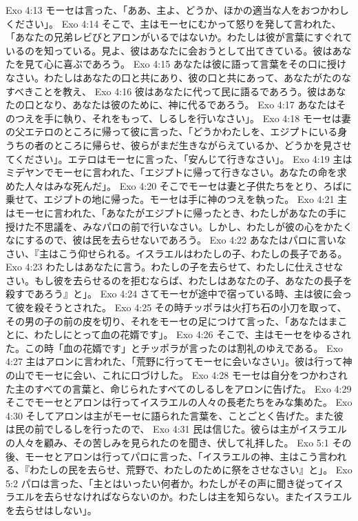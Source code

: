 Exo 4:13  モーセは言った、「ああ、主よ、どうか、ほかの適当な人をおつかわしください」。
Exo 4:14  そこで、主はモーセにむかって怒りを発して言われた、「あなたの兄弟レビびとアロンがいるではないか。わたしは彼が言葉にすぐれているのを知っている。見よ、彼はあなたに会おうとして出てきている。彼はあなたを見て心に喜ぶであろう。
Exo 4:15  あなたは彼に語って言葉をその口に授けなさい。わたしはあなたの口と共にあり、彼の口と共にあって、あなたがたのなすべきことを教え、
Exo 4:16  彼はあなたに代って民に語るであろう。彼はあなたの口となり、あなたは彼のために、神に代るであろう。
Exo 4:17  あなたはそのつえを手に執り、それをもって、しるしを行いなさい」。
Exo 4:18  モーセは妻の父エテロのところに帰って彼に言った、「どうかわたしを、エジプトにいる身うちの者のところに帰らせ、彼らがまだ生きながらえているか、どうかを見させてください」。エテロはモーセに言った、「安んじて行きなさい」。
Exo 4:19  主はミデヤンでモーセに言われた、「エジプトに帰って行きなさい。あなたの命を求めた人々はみな死んだ」。
Exo 4:20  そこでモーセは妻と子供たちをとり、ろばに乗せて、エジプトの地に帰った。モーセは手に神のつえを執った。
Exo 4:21  主はモーセに言われた、「あなたがエジプトに帰ったとき、わたしがあなたの手に授けた不思議を、みなパロの前で行いなさい。しかし、わたしが彼の心をかたくなにするので、彼は民を去らせないであろう。
Exo 4:22  あなたはパロに言いなさい、『主はこう仰せられる。イスラエルはわたしの子、わたしの長子である。
Exo 4:23  わたしはあなたに言う。わたしの子を去らせて、わたしに仕えさせなさい。もし彼を去らせるのを拒むならば、わたしはあなたの子、あなたの長子を殺すであろう』と」。
Exo 4:24  さてモーセが途中で宿っている時、主は彼に会って彼を殺そうとされた。
Exo 4:25  その時チッポラは火打ち石の小刀を取って、その男の子の前の皮を切り、それをモーセの足につけて言った、「あなたはまことに、わたしにとって血の花婿です」。
Exo 4:26  そこで、主はモーセをゆるされた。この時「血の花婿です」とチッポラが言ったのは割礼のゆえである。
Exo 4:27  主はアロンに言われた、「荒野に行ってモーセに会いなさい」。彼は行って神の山でモーセに会い、これに口づけした。
Exo 4:28  モーセは自分をつかわされた主のすべての言葉と、命じられたすべてのしるしをアロンに告げた。
Exo 4:29  そこでモーセとアロンは行ってイスラエルの人々の長老たちをみな集めた。
Exo 4:30  そしてアロンは主がモーセに語られた言葉を、ことごとく告げた。また彼は民の前でしるしを行ったので、
Exo 4:31  民は信じた。彼らは主がイスラエルの人々を顧み、その苦しみを見られたのを聞き、伏して礼拝した。
Exo 5:1  その後、モーセとアロンは行ってパロに言った、「イスラエルの神、主はこう言われる、『わたしの民を去らせ、荒野で、わたしのために祭をさせなさい』と」。
Exo 5:2  パロは言った、「主とはいったい何者か。わたしがその声に聞き従ってイスラエルを去らせなければならないのか。わたしは主を知らない。またイスラエルを去らせはしない」。
